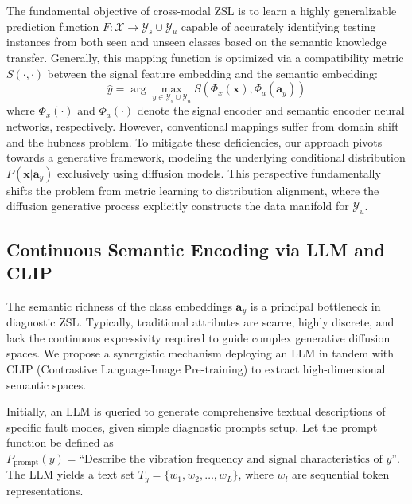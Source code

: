 The fundamental objective of cross-modal ZSL is to learn a highly generalizable prediction function $F: \mathcal{X} \rightarrow \mathcal{Y}_s \cup \mathcal{Y}_u$ capable of accurately identifying testing instances from both seen and unseen classes based on the semantic knowledge transfer. Generally, this mapping function is optimized via a compatibility metric $S(\cdot, \cdot)$ between the signal feature embedding and the semantic embedding:
\begin{equation}\label{eq:general_compatibility}
\hat{y} = \arg\max_{y \in \mathcal{Y}_s \cup \mathcal{Y}_u} S\left( \Phi_x(\mathbf{x}), \Phi_a(\mathbf{a}_y) \right)
\end{equation}
where $\Phi_x(\cdot)$ and $\Phi_a(\cdot)$ denote the signal encoder and semantic encoder neural networks, respectively. However, conventional mappings suffer from domain shift and the hubness problem. To mitigate these deficiencies, our approach pivots towards a generative framework, modeling the underlying conditional distribution $P(\mathbf{x}|\mathbf{a}_y)$ exclusively using diffusion models. This perspective fundamentally shifts the problem from metric learning to distribution alignment, where the diffusion generative process explicitly constructs the data manifold for $\mathcal{Y}_u$.

\subsection{Continuous Semantic Encoding via LLM and CLIP}
\label{subsec:continuous_semantic}

The semantic richness of the class embeddings $\mathbf{a}_y$ is a principal bottleneck in diagnostic ZSL. Typically, traditional attributes are scarce, highly discrete, and lack the continuous expressivity required to guide complex generative diffusion spaces. We propose a synergistic mechanism deploying an LLM in tandem with CLIP (Contrastive Language-Image Pre-training) to extract high-dimensional semantic spaces.

Initially, an LLM is queried to generate comprehensive textual descriptions of specific fault modes, given simple diagnostic prompts setup. Let the prompt function be defined as $P_{\text{prompt}}(y) = \text{“Describe the vibration frequency and signal characteristics of } y \text{”}$. The LLM yields a text set $T_y = \{w_1, w_2, \dots, w_L\}$, where $w_l$ are sequential token representations. 

